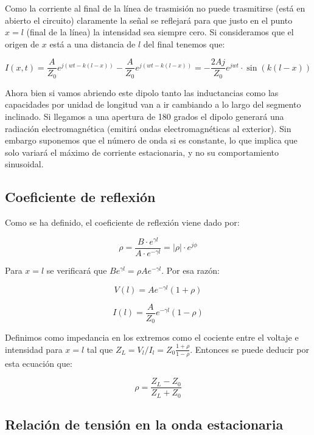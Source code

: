 \documentclass[12pt,a4paper]{article}
\begin{document}
Como la corriente al final de la línea de trasmisión no puede trasmitirse (está en abierto el circuito) claramente la señal se reflejará para que justo en el punto $x=l$ (final de la línea) la intensidad sea siempre cero. Si consideramos que el origen de $x$ está a una distancia de $l$ del final tenemos que:

\begin{equation}
I (x,t) = \dfrac{A}{Z_0 } e^{j(wt - k(l-x))} - \dfrac{A}{Z_0 } e^{j(wt - k(l-x))} = - \dfrac{2 A j}{Z_0} e^{jwt} \cdot \sin (k(l-x))
\end{equation}

Ahora bien si vamos abriendo este dipolo tanto las inductancias como las capacidades por unidad de longitud van a ir cambiando a lo largo del segmento inclinado. Si llegamos a una apertura de 180 grados el dipolo generará una radiación electromagnética (emitirá ondas electromagnéticas al exterior). Sin embargo suponemos que el número de onda si es constante, lo que implica que solo variará el máximo de corriente estacionaria, y no su comportamiento sinusoidal.


\subsection{Coeficiente de reflexión}

Como se ha definido, el coeficiente de reflexión viene dado por:

$$ \rho = \dfrac{B \cdot e^{\gamma l}}{A \cdot e^{-\gamma l}} = |\rho| \cdot e^{j \phi} $$

Para $x=l$ se verificará que $B e^{\gamma l} = \rho A e^{-\gamma l}$. Por esa razón:

\begin{equation}
V(l) = A e^{-\gamma l} (1+ \rho)
\end{equation}

\begin{equation}
I(l) = \frac{A}{Z_0} e^{-\gamma l} (1-\rho)
\end{equation}

Definimos como impedancia en los extremos como el cociente entre el voltaje e intensidad para $x=l$ tal que $Z_L = V_l / I_l = Z_0 \frac{1+\rho}{1-\rho}$. Entonces se puede deducir por esta ecuación que:

\begin{equation}
\rho = \frac{Z_L - Z_0}{Z_L+Z_0}
\end{equation}

\subsection{Relación de tensión en la onda estacionaria}
\end{document}
